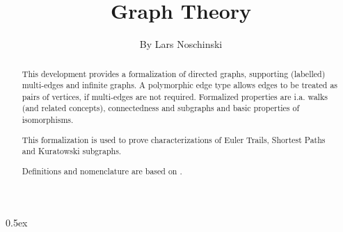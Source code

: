 \documentclass[11pt,a4paper]{article}
\begin{document}
\title{Graph Theory}
\author{By Lars Noschinski}
\maketitle

\begin{abstract}
This development provides a formalization of directed graphs, supporting
(labelled) multi-edges and infinite graphs. A polymorphic edge type allows
edges to be treated as pairs of vertices, if multi-edges are not required.
Formalized properties are i.a. walks (and related concepts), connectedness and
subgraphs and basic properties of isomorphisms.

This formalization is used to prove characterizations of Euler Trails, Shortest
Paths and Kuratowski subgraphs.

Definitions and nomenclature are based on \cite{bangjensen2009digraphs}.
\end{abstract}


\tableofcontents

\parindent 0pt\parskip 0.5ex





\end{document}
